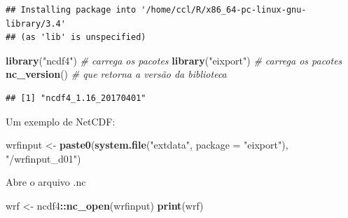 \documentclass[]{book}
\newenvironment{Shaded}{\begin{snugshade}}{\end{snugshade}}
\newcommand{\KeywordTok}[1]{\textcolor[rgb]{0.13,0.29,0.53}{\textbf{#1}}}
\newcommand{\DataTypeTok}[1]{\textcolor[rgb]{0.13,0.29,0.53}{#1}}
\newcommand{\StringTok}[1]{\textcolor[rgb]{0.31,0.60,0.02}{#1}}
\newcommand{\CommentTok}[1]{\textcolor[rgb]{0.56,0.35,0.01}{\textit{#1}}}
\newcommand{\OperatorTok}[1]{\textcolor[rgb]{0.81,0.36,0.00}{\textbf{#1}}}
\newcommand{\NormalTok}[1]{#1}
\theoremstyle{definition}
\theoremstyle{definition}
\theoremstyle{definition}
\theoremstyle{remark}
\begin{document}
\begin{verbatim}
## Installing package into '/home/ccl/R/x86_64-pc-linux-gnu-library/3.4'
## (as 'lib' is unspecified)
\end{verbatim}

\begin{Shaded}
\begin{Highlighting}[]
\KeywordTok{library}\NormalTok{(}\StringTok{"ncdf4"}\NormalTok{)            }\CommentTok{# carrega os pacotes}
\KeywordTok{library}\NormalTok{(}\StringTok{"eixport"}\NormalTok{)          }\CommentTok{# carrega os pacotes}
\KeywordTok{nc_version}\NormalTok{()                }\CommentTok{# que retorna a versão da biblioteca}
\end{Highlighting}
\end{Shaded}

\begin{verbatim}
## [1] "ncdf4_1.16_20170401"
\end{verbatim}

Um exemplo de NetCDF:

\begin{Shaded}
\begin{Highlighting}[]
\NormalTok{wrfinput <-}\StringTok{ }\KeywordTok{paste0}\NormalTok{(}\KeywordTok{system.file}\NormalTok{(}\StringTok{"extdata"}\NormalTok{, }\DataTypeTok{package =} \StringTok{"eixport"}\NormalTok{), }\StringTok{"/wrfinput_d01"}\NormalTok{)}
\end{Highlighting}
\end{Shaded}

Abre o arquivo .nc

\begin{Shaded}
\begin{Highlighting}[]
\NormalTok{wrf <-}\StringTok{ }\NormalTok{ncdf4}\OperatorTok{::}\KeywordTok{nc_open}\NormalTok{(wrfinput)}
\KeywordTok{print}\NormalTok{(wrf)}
\end{Highlighting}
\end{Shaded}
\end{document}
